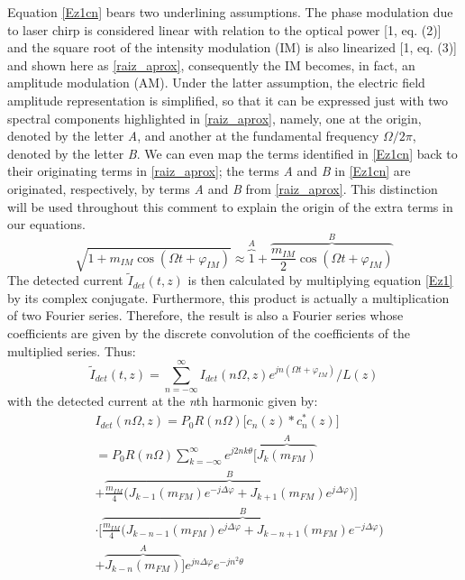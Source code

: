 \documentclass[journal]{IEEEtran}
\begin{document}
Equation \eqref{Ez1cn} bears two underlining assumptions. The phase modulation due to laser chirp is considered linear with relation to the optical power [1, eq. (2)] and the square root of the intensity modulation (IM) is also linearized [1, eq. (3)] and shown here as \eqref{raiz_aprox}, consequently the IM becomes, in fact, an amplitude modulation (AM). Under the latter assumption, the electric field amplitude representation is simplified, so that it can be expressed just with two spectral components highlighted in \eqref{raiz_aprox}, namely, one at the origin, denoted by the letter \emph{A}, and another at the fundamental frequency $\Omega/2\pi$, denoted by the letter \emph{B}. We can even map the terms identified in \eqref{Ez1cn} back to their originating terms in \eqref{raiz_aprox}; the terms \emph{A} and \emph{B} in \eqref{Ez1cn} are originated, respectively, by terms \emph{A} and \emph{B} from \eqref{raiz_aprox}. This distinction will be used throughout this comment to explain the origin of the extra terms in our equations.
\begin{equation} \label{raiz_aprox}
\sqrt{1 + m_{IM}\cos(\Omega t + \varphi_{IM})} \approx \overbrace{1}^{A} + \overbrace{\frac{m_{IM}}{2}\cos(\Omega t + \varphi_{IM})}^{B}
\end{equation}
The detected current $\tilde{I}_{det}(t,z)$ is then calculated by multiplying equation \eqref{Ez1} by its complex conjugate. Furthermore, this product is actually a multiplication of two Fourier series. Therefore, the result is also a Fourier series whose coefficients are given by the discrete convolution of the coefficients of the multiplied series. Thus:
\begin{equation} \label{I}
\tilde{I}_{det}(t, z) = \sum_{n = -\infty}^{\infty}I_{det}(n\Omega,z)e^{jn(\Omega t + \varphi_{IM})}/L(z)
\end{equation}
with the detected current at the \emph{n}th harmonic given by:
\begin{align} \label{Idet_prod} \nonumber	
&I_{det}(n\Omega, z) = P_0R(n\Omega)\Big[c_n(z)*c_n^{*}(z)\Big] \\ \nonumber
& = P_0R(n\Omega)\sum_{k = -\infty}^{\infty}e^{j2nk\theta}\bigg[\overbrace{J_k(m_{FM})}^{A} \\ \nonumber
& + \overbrace{\frac{m_{IM}}{4}\bigg(J_{k-1}(m_{FM})e^{-j\Delta\varphi} + J_{k+1}(m_{FM})e^{j\Delta\varphi}\bigg)}^{B}\bigg] \\ \nonumber
& \cdot\bigg[\overbrace{\frac{m_{IM}}{4}\bigg(J_{k-n-1}(m_{FM})e^{j\Delta\varphi} + J_{k-n+1}(m_{FM})e^{-j\Delta\varphi}\bigg)}^{B} \\ 
& + \overbrace{J_{k-n}(m_{FM})}^{A}\bigg]e^{jn\Delta\varphi}e^{-jn^2\theta} 
\end{align}
\end{document}
